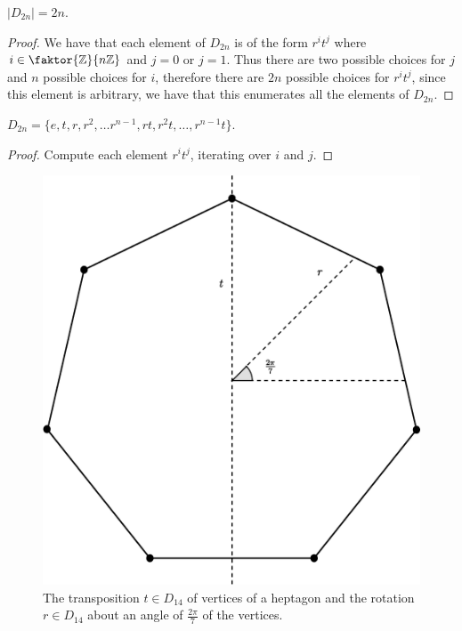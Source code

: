 \begin{corollary}
  $|D_{2n}|=2n$.
\end{corollary}
\begin{proof}
  We have that each element of $D_{2n}$ is of the form $r^it^j$ where $i \in
  \faktor{\Z}{n\Z}$ and $j=0$ or $j=1$. Thus there are two possible choices
  for $j$ and  $n$ possible choices for $i$, therefore there are  $2n$
  possible choices for  $r^it^j$, since this element is arbitrary, we have
  that this enumerates all the elements of  $D_{2n}$.
\end{proof}
\begin{corollary}
  $D_{2n}=\{e, t, r, r^2, \dots r^{n-1}, rt, r^2t, \dots, r^{n-1}t\}$.
\end{corollary}
\begin{proof}
  Compute each element  $r^it^j$, iterating over $i$ and  $j$.
\end{proof}

\begin{figure}
  \centering
  \includegraphics[scale=0.2]{parts/group_theory/figures/Chapter1/D_14.eps}
  \caption{The transposition $t \in D_{14}$ of vertices of a heptagon and the
  rotation $r \in D_{14}$ about an angle of $\frac{2\pi}{7}$ of the vertices.}
  \label{figure_1.1}
\end{figure}

